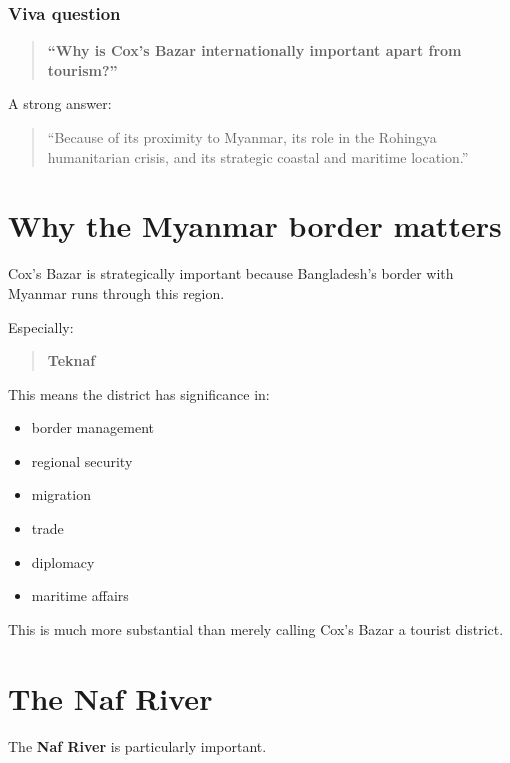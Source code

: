 \subsubsection{Viva question}

\begin{quote}
\textbf{``Why is Cox's Bazar internationally important apart from tourism?''}\\
\end{quote}

A strong answer:

\begin{quote}
``Because of its proximity to Myanmar, its role in the Rohingya humanitarian crisis, and its strategic coastal and maritime location.''\\
\end{quote}

\medskip

\section{Why the Myanmar border matters}

Cox's Bazar is strategically important because Bangladesh's border with Myanmar runs through this region.

Especially:

\begin{quote}
\textbf{Teknaf}\\
\end{quote}

This means the district has significance in:

\begin{itemize}
  \item border management
  \item regional security
  \item migration
  \item trade
  \item diplomacy
  \item maritime affairs
\end{itemize}

This is much more substantial than merely calling Cox's Bazar a tourist district.

\medskip

\section{The Naf River}

The \textbf{Naf River} is particularly important.

